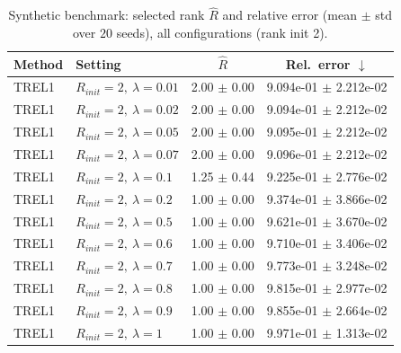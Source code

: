 \begin{table}[t]
\centering
\caption{Synthetic benchmark: selected rank \(\hat R\) and relative error (mean \(\pm\) std over \(20\) seeds), all configurations (rank init 2).}
\label{tab:results_synth_all}
\begin{tabular}{@{}llcc@{}}
\toprule
Method & Setting & \(\hat R\) & Rel.\ error \(\downarrow\) \\ \midrule
TREL1 & \(R_{init}=2,\ \lambda=0.01\) & 2.00 $\pm$ 0.00 & 9.094e-01 $\pm$ 2.212e-02 \\
TREL1 & \(R_{init}=2,\ \lambda=0.02\) & 2.00 $\pm$ 0.00 & 9.094e-01 $\pm$ 2.212e-02 \\
TREL1 & \(R_{init}=2,\ \lambda=0.05\) & 2.00 $\pm$ 0.00 & 9.095e-01 $\pm$ 2.212e-02 \\
TREL1 & \(R_{init}=2,\ \lambda=0.07\) & 2.00 $\pm$ 0.00 & 9.096e-01 $\pm$ 2.212e-02 \\
TREL1 & \(R_{init}=2,\ \lambda=0.1\) & 1.25 $\pm$ 0.44 & 9.225e-01 $\pm$ 2.776e-02 \\
TREL1 & \(R_{init}=2,\ \lambda=0.2\) & 1.00 $\pm$ 0.00 & 9.374e-01 $\pm$ 3.866e-02 \\
TREL1 & \(R_{init}=2,\ \lambda=0.5\) & 1.00 $\pm$ 0.00 & 9.621e-01 $\pm$ 3.670e-02 \\
TREL1 & \(R_{init}=2,\ \lambda=0.6\) & 1.00 $\pm$ 0.00 & 9.710e-01 $\pm$ 3.406e-02 \\
TREL1 & \(R_{init}=2,\ \lambda=0.7\) & 1.00 $\pm$ 0.00 & 9.773e-01 $\pm$ 3.248e-02 \\
TREL1 & \(R_{init}=2,\ \lambda=0.8\) & 1.00 $\pm$ 0.00 & 9.815e-01 $\pm$ 2.977e-02 \\
TREL1 & \(R_{init}=2,\ \lambda=0.9\) & 1.00 $\pm$ 0.00 & 9.855e-01 $\pm$ 2.664e-02 \\
TREL1 & \(R_{init}=2,\ \lambda=1\) & 1.00 $\pm$ 0.00 & 9.971e-01 $\pm$ 1.313e-02 \\
\bottomrule
\end{tabular}
\end{table}